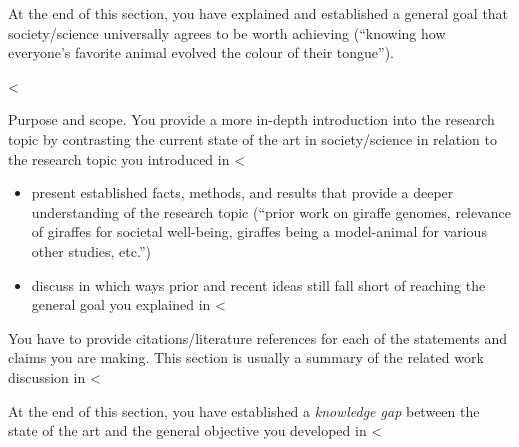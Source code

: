 \documentclass[runningheads,a4paper,english]{llncs}[2018/03/10]
\begin{document}
{At the end of this section, you have explained and established a general goal that society/science universally agrees to be worth achieving (``knowing how everyone's favorite animal evolved the colour of their tongue'').

<%

\textsf{Purpose and scope}. You provide a more in-depth introduction into the research topic by contrasting the current state of the art in society/science in relation to the research topic you introduced in <%

\begin{itemize}
    \item present established facts, methods, and results that provide a deeper  understanding of the research topic (``prior work on giraffe genomes, relevance of giraffes for societal well-being, giraffes being a model-animal for various other studies, etc.'')
    \item discuss in which ways prior and recent ideas still fall short of reaching the general goal you explained in <%
\end{itemize}

You have to provide citations/literature references for each of the statements and claims you are making. This section is usually a summary of the related work discussion in <%

At the end of this section, you have established a \emph{knowledge gap} between the state of the art and the general objective you developed in <%


}
\end{document}
